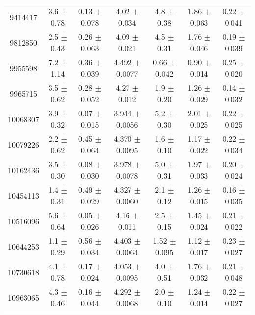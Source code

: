 \begin{table*}
\begin{tabular}{c|cccccc}
9414417  &        3.6    $\pm$  0.78   &      0.13   $\pm$  0.078  &      4.02   $\pm$  0.034  &      4.8    $\pm$  0.38   &      1.86   $\pm$  0.063  &      0.22   $\pm$  0.041    \\
9812850  &        2.5    $\pm$  0.43   &      0.26   $\pm$  0.063  &      4.09   $\pm$  0.021  &      4.5    $\pm$  0.31   &      1.76   $\pm$  0.046  &      0.19   $\pm$  0.039    \\
9955598  &        7.2    $\pm$  1.14   &      0.36   $\pm$  0.039  &      4.492  $\pm$  0.0077 &      0.66   $\pm$  0.042  &      0.90   $\pm$  0.014  &      0.25   $\pm$  0.020    \\
9965715  &        3.5    $\pm$  0.62   &      0.28   $\pm$  0.052  &      4.27   $\pm$  0.012  &      1.9    $\pm$  0.20   &      1.26   $\pm$  0.029  &      0.14   $\pm$  0.032    \\
10068307 &        3.9    $\pm$  0.32   &      0.07   $\pm$  0.015  &      3.944  $\pm$  0.0056 &      5.2    $\pm$  0.30   &      2.01   $\pm$  0.025  &      0.22   $\pm$  0.025    \\
10079226 &        2.2    $\pm$  0.62   &      0.45   $\pm$  0.064  &      4.370  $\pm$  0.0095 &      1.6    $\pm$  0.10   &      1.17   $\pm$  0.022  &      0.22   $\pm$  0.034    \\
10162436 &        3.5    $\pm$  0.30   &      0.08   $\pm$  0.030  &      3.978  $\pm$  0.0078 &      5.0    $\pm$  0.31   &      1.97   $\pm$  0.033  &      0.20   $\pm$  0.024    \\
10454113 &        1.4    $\pm$  0.31   &      0.49   $\pm$  0.029  &      4.327  $\pm$  0.0060 &      2.1    $\pm$  0.12   &      1.26   $\pm$  0.015  &      0.16   $\pm$  0.035    \\
10516096 &        5.6    $\pm$  0.64   &      0.05   $\pm$  0.026  &      4.16   $\pm$  0.011  &      2.5    $\pm$  0.15   &      1.45   $\pm$  0.024  &      0.21   $\pm$  0.022    \\
10644253 &        1.1    $\pm$  0.29   &      0.56   $\pm$  0.034  &      4.403  $\pm$  0.0064 &      1.52   $\pm$  0.095  &      1.12   $\pm$  0.017  &      0.23   $\pm$  0.027    \\
10730618 &        4.1    $\pm$  0.78   &      0.17   $\pm$  0.024  &      4.053  $\pm$  0.0095 &      4.0    $\pm$  0.51   &      1.76   $\pm$  0.032  &      0.21   $\pm$  0.048    \\
10963065 &        4.3    $\pm$  0.46   &      0.16   $\pm$  0.044  &      4.292  $\pm$  0.0068 &      2.0    $\pm$  0.10   &      1.24   $\pm$  0.014  &      0.22   $\pm$  0.027    \\

\end{tabular}
\end{table*}
